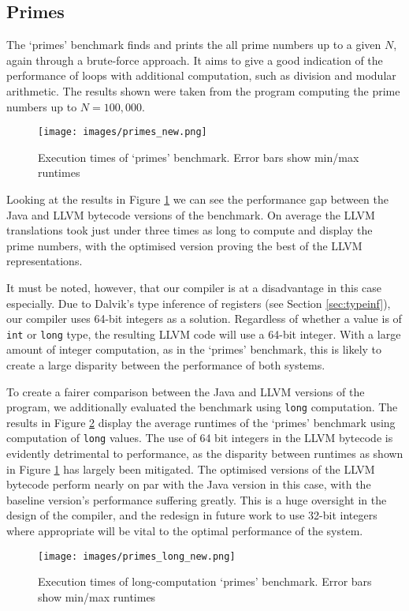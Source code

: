 \subsection*{Primes}

The `primes' benchmark finds and prints the all prime numbers up to a given $N$, again through a brute-force approach. It aims to give a good indication of the performance of loops with additional computation, such as division and modular arithmetic. The results shown were taken from the program computing the prime numbers up to $N = 100,000$.

\begin{figure}[h!]
    \centering
    \texttt{[image: images/primes\_new.png]}
    \caption[Execution times of `primes' benchmark]{Execution times of `primes' benchmark. Error bars show min/max runtimes}
    \label{fig:res_primes}
\end{figure}

Looking at the results in Figure \ref{fig:res_primes} we can see the performance gap between the Java and LLVM bytecode versions of the benchmark. On average the LLVM translations took just under three times as long to compute and display the prime numbers, with the optimised version proving the best of the LLVM representations.

It must be noted, however, that our compiler is at a disadvantage in this case especially. Due to Dalvik's type inference of registers (see Section \ref{sec:typeinf}), our compiler uses 64-bit integers as a solution. Regardless of whether a value is of \verb|int| or \verb|long| type, the resulting LLVM code will use a 64-bit integer. With a large amount of integer computation, as in the `primes' benchmark, this is likely to create a large disparity between the performance of both systems.

To create a fairer comparison between the Java and LLVM versions of the program, we additionally evaluated the benchmark using \verb|long| computation. The results in Figure \ref{fig:res_primes_long} display the average runtimes of the `primes' benchmark using computation of \verb|long| values. The use of 64 bit integers in the LLVM bytecode is evidently detrimental to performance, as the disparity between runtimes as shown in Figure \ref{fig:res_primes} has largely been mitigated. The optimised versions of the LLVM bytecode perform nearly on par with the Java version in this case, with the baseline version's performance suffering greatly. This is a huge oversight in the design of the compiler, and the redesign in future work to use 32-bit integers where appropriate will be vital to the optimal performance of the system.

\begin{figure}[h!]
    \centering
    \texttt{[image: images/primes\_long\_new.png]}
    \caption[Execution times of long-computation `primes' benchmark]{Execution times of long-computation `primes' benchmark. Error bars show min/max runtimes}
    \label{fig:res_primes_long}
\end{figure}
